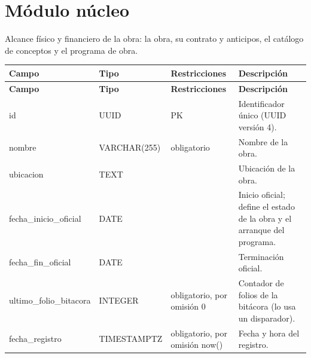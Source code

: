 
\section{Módulo núcleo}
Alcance físico y financiero de la obra: la obra, su contrato y anticipos, el catálogo de conceptos y el programa de obra.

\begin{xltabular}{\linewidth}{@{}>{\ttfamily\footnotesize}p{4.9cm}>{\ttfamily\footnotesize}p{2.4cm}>{\raggedright\arraybackslash\footnotesize}p{3.3cm}>{\footnotesize}X@{}}
\toprule\normalfont\sffamily\bfseries\footnotesize Campo & \normalfont\sffamily\bfseries\footnotesize Tipo & \sffamily\bfseries Restricciones & \sffamily\bfseries Descripción\\\midrule\endfirsthead
\toprule\normalfont\sffamily\bfseries\footnotesize Campo & \normalfont\sffamily\bfseries\footnotesize Tipo & \sffamily\bfseries Restricciones & \sffamily\bfseries Descripción\\\midrule\endhead
\bottomrule\endfoot
id & UUID & PK & Identificador único (UUID versión 4).\\
nombre & VARCHAR(255) & obligatorio & Nombre de la obra.\\
ubicacion & TEXT &  & Ubicación de la obra.\\
fecha\_inicio\_oficial & DATE &  & Inicio oficial; define el estado de la obra y el arranque del programa.\\
fecha\_fin\_oficial & DATE &  & Terminación oficial.\\
ultimo\_folio\_bitacora & INTEGER & obligatorio, por omisión 0 & Contador de folios de la bitácora (lo usa un disparador).\\
fecha\_registro & TIMESTAMPTZ & obligatorio, por omisión now() & Fecha y hora del registro.\\
\end{xltabular}

